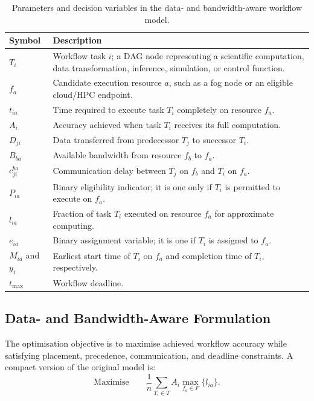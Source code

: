 \begin{table}[t]
\centering
\caption{Parameters and decision variables in the data- and bandwidth-aware workflow model.}
\label{tab:continuum_variables}
\small
\begin{tabular}{|p{}|p{}|}
\hline
\textbf{Symbol} & \textbf{Description} \\
\hline
$T_i$ & Workflow task $i$; a DAG node representing a scientific computation, data transformation, inference, simulation, or control function. \\
\hline
$f_a$ & Candidate execution resource $a$, such as a fog node or an eligible cloud/HPC endpoint. \\
\hline
$t_{ia}$ & Time required to execute task $T_i$ completely on resource $f_a$. \\
\hline
$A_i$ & Accuracy achieved when task $T_i$ receives its full computation. \\
\hline
$D_{ji}$ & Data transferred from predecessor $T_j$ to successor $T_i$. \\
\hline
$B_{ba}$ & Available bandwidth from resource $f_b$ to $f_a$. \\
\hline
$c_{ji}^{ba}$ & Communication delay between $T_j$ on $f_b$ and $T_i$ on $f_a$. \\
\hline
$P_{ia}$ & Binary eligibility indicator; it is one only if $T_i$ is permitted to execute on $f_a$. \\
\hline
$l_{ia}$ & Fraction of task $T_i$ executed on resource $f_a$ for approximate computing. \\
\hline
$e_{ia}$ & Binary assignment variable; it is one if $T_i$ is assigned to $f_a$. \\
\hline
$M_{ia}$ and $y_i$ & Earliest start time of $T_i$ on $f_a$ and completion time of $T_i$, respectively. \\
\hline
$t_{\max}$ & Workflow deadline. \\
\hline
\end{tabular}
\end{table}

\subsection{Data- and Bandwidth-Aware Formulation}

The optimisation objective is to maximise achieved workflow accuracy while satisfying placement, precedence, communication, and deadline constraints. A compact version of the original model is:
\begin{equation}
 \text{Maximise}\qquad \frac{1}{n}\sum_{T_i\in T} A_i\max_{f_a\in F}\{l_{ia}\}.
 \label{eq:continuum_objective}
\end{equation}

